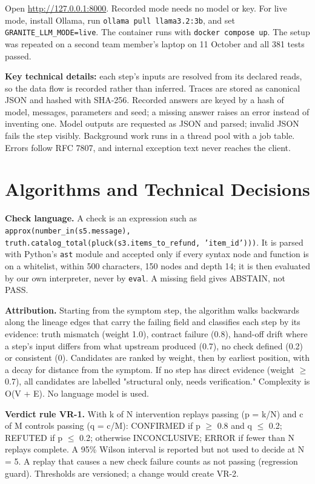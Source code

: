 \documentclass{fast-nuces-bs}
\begin{document}
Open \url{http://127.0.0.1:8000}. Recorded mode needs no model or key. For live mode, install Ollama, run \texttt{ollama pull llama3.\allowbreak{}2:3b}, and set \texttt{GRANITE\_\allowbreak{}LLM\_\allowbreak{}MODE=live}. The container runs with \texttt{docker compose up}. The setup was repeated on a second team member's laptop on 11 October and all 381 tests passed.

\textbf{Key technical details:} each step's inputs are resolved from its declared reads, so the data flow is recorded rather than inferred. Traces are stored as canonical JSON and hashed with SHA-256. Recorded answers are keyed by a hash of model, messages, parameters and seed; a missing answer raises an error instead of inventing one. Model outputs are requested as JSON and parsed; invalid JSON fails the step visibly. Background work runs in a thread pool with a job table. Errors follow RFC 7807, and internal exception text never reaches the client.

\section{Algorithms and Technical Decisions}

\textbf{Check language.} A check is an expression such as \texttt{approx(\allowbreak{}number\_\allowbreak{}in(\allowbreak{}s5.\allowbreak{}message),\allowbreak{} truth.\allowbreak{}catalog\_\allowbreak{}total(\allowbreak{}pluck(\allowbreak{}s3.\allowbreak{}items\_\allowbreak{}to\_\allowbreak{}refund,\allowbreak{} 'item\_\allowbreak{}id')))}. It is parsed with Python's \texttt{ast} module and accepted only if every syntax node and function is on a whitelist, within 500 characters, 150 nodes and depth 14; it is then evaluated by our own interpreter, never by \texttt{eval}. A missing field gives ABSTAIN, not PASS.

\textbf{Attribution.} Starting from the symptom step, the algorithm walks backwards along the lineage edges that carry the failing field and classifies each step by its evidence: truth mismatch (weight 1.0), contract failure (0.8), hand-off drift where a step's input differs from what upstream produced (0.7), no check defined (0.2) or consistent (0). Candidates are ranked by weight, then by earliest position, with a decay for distance from the symptom. If no step has direct evidence (weight $\geq$ 0.7), all candidates are labelled "structural only, needs verification." Complexity is O(V + E). No language model is used.

\textbf{Verdict rule VR-1.} With k of N intervention replays passing (p = k/N) and c of M controls passing (q = c/M): CONFIRMED if p $\geq$ 0.8 and q $\leq$ 0.2; REFUTED if p $\leq$ 0.2; otherwise INCONCLUSIVE; ERROR if fewer than N replays complete. A 95\% Wilson interval is reported but not used to decide at N = 5. A replay that causes a new check failure counts as not passing (regression guard). Thresholds are versioned; a change would create VR-2.
\end{document}
